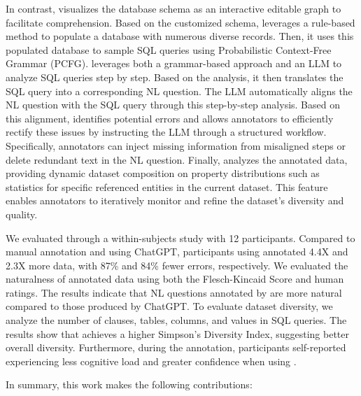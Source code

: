 In contrast, {\tool} visualizes the database schema as an interactive editable graph to facilitate comprehension. Based on the customized schema, {\tool} leverages a rule-based method to populate a database with numerous diverse records. Then, it uses this populated database to sample SQL queries using Probabilistic Context-Free Grammar (PCFG).
{\tool} leverages both a grammar-based approach and an LLM to analyze SQL queries step by step. Based on the analysis, it then translates the SQL query into a corresponding NL question. The LLM automatically aligns the NL question with the SQL query through this step-by-step analysis. Based on this alignment, {\tool} identifies potential errors and allows annotators to efficiently rectify these issues by instructing the LLM through a structured workflow.
Specifically, annotators can inject missing information from misaligned steps or delete redundant text in the NL question.
Finally, {\tool} analyzes the annotated data, providing dynamic dataset composition on property distributions such as statistics for specific referenced entities in the current dataset. This feature enables annotators to iteratively monitor and refine the dataset's diversity and quality.


We evaluated {\tool} through a within-subjects study with 12 participants. Compared to manual annotation and using ChatGPT, participants using {\tool} annotated 4.4X and 2.3X more data,  with 87\% and 84\% fewer errors, respectively.
We evaluated the naturalness of annotated data using both the Flesch-Kincaid Score and human ratings. The results indicate that NL questions annotated by {\tool} are more natural compared to those produced by ChatGPT.
To evaluate dataset diversity, we analyze the number of clauses, tables, columns, and values in SQL queries. The results show that {\tool} achieves a higher Simpson's Diversity Index, suggesting better overall diversity.
Furthermore, during the annotation, participants self-reported experiencing less cognitive load and greater confidence when using {\tool}.

In summary, this work makes the following contributions:%

